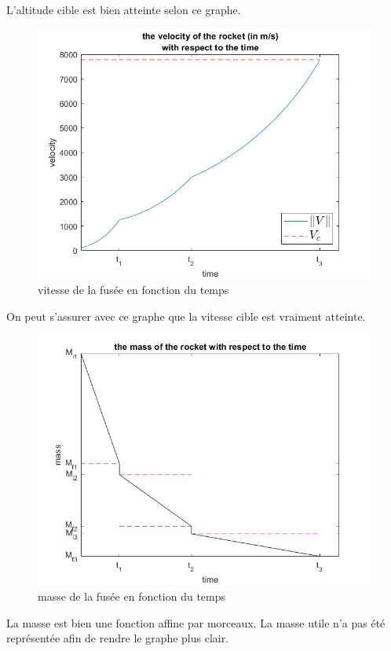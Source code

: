 L'altitude cible est bien atteinte selon ce graphe.

\clearpage
\begin{center}
\begin{figure}[t]
\includegraphics[scale=0.65]{./graphs/velocity.jpg}
\caption{vitesse de la fusée en fonction du temps}
\end{figure}
\end{center}

On peut s'assurer avec ce graphe que la vitesse cible est vraiment atteinte.

\clearpage
\begin{center}
\begin{figure}[t]
\includegraphics[scale=0.65]{./graphs/mass.jpg}
\caption{masse de la fusée en fonction du temps}
\end{figure}
\end{center}

La masse est bien une fonction affine par morceaux. La masse utile n'a pas été représentée afin de rendre le graphe plus clair.
